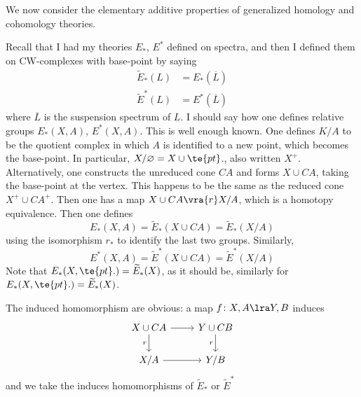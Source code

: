 \documentclass[../main]{subfiles}
\begin{document}
    We now consider the elementary additive properties of generalized homology and cohomology theories.
    
    Recall that I had my theories $E_\ast$, $E^\ast$ defined on spectra, and then I defined them on CW-complexes with base-point by saying
    \begin{align}
        \widetilde{E}_\ast(L) &= E_\ast(\overline{L}) \nonumber \\
        \widetilde{E}^\ast(L) &= E^\ast(\overline{L}) \nonumber
    \end{align}
    where $\overline{L}$ is the suspension spectrum of $L$. I should say how one defines relative groups $E_\ast(X,A)$, $E^\ast(X, A)$. This is well enough known. One defines $K/A$ to be the quotient complex in which $A$ is identified to a new point, which becomes the base-point. In particular, $X/\varnothing=X\cup \te{pt}$., also written $X^+$. Alternatively, one constructs the unreduced cone $CA$ and forms $X\cup CA$, taking the base-point at the vertex. This happens to be the same as the reduced cone $X^+ \cup CA^+$. Then one has a map $X\cup CA\vra{r} X/A$, which is a homotopy equivalence. Then one defines
    \[E_\ast(X,A) = \widetilde{E}_\ast(X\cup CA)=\widetilde{E}_\ast(X/A)\]
    using the isomorphism $r_\ast$ to identify the last two groups. Similarly,
    \[E^\ast(X,A) = \widetilde{E}^\ast(X\cup CA)=\widetilde{E}^\ast(X/A)\]
    Note that $E_\ast(X, \te{pt}.)=\widetilde{E}_\ast(X)$, as it should be, similarly for $E_\ast(X, \te{pt}.)=\widetilde{E}_\ast(X)$.
    
    The induced homomorphism are obvious: a map $f\colon X, A\lra Y, B$ induces
    \[\begin{tikzcd}
    	{X\cup CA} & {Y\cup CB} \\
    	{X/A} & {Y/B}
    	\arrow[from=1-1, to=1-2]
    	\arrow["r"', from=1-2, to=2-2]
    	\arrow["r"', from=1-1, to=2-1]
    	\arrow[from=2-1, to=2-2]
    \end{tikzcd}\]
    and we take the induces homomorphisms of $\widetilde{E}_\ast$ or $\widetilde{E}^\ast$
    
\end{document}
